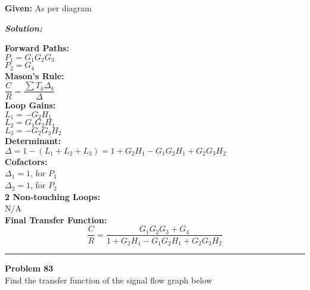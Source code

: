 \documentclass[11pt,letterpaper]{article}
\begin{document}
\noindent\textbf{Given:} As per diagram

\vspace{12pt}
\noindent\textit{\textbf{Solution:}}
\begin{center}
\vspace{12pt}

\noindent\textbf{Forward Paths:} \\
\hspace*{1em} \( P_1 = G_1G_2G_3 \) \\
\hspace*{1em} \( P_2 = G_4 \) \\[6pt]

\noindent\textbf{Mason's Rule:} \\
\hspace*{1em} \( \dfrac{C}{R} = \dfrac{\sum T_k\Delta_k}{\Delta} \) \\[6pt]

\noindent\textbf{Loop Gains:} \\
\hspace*{1em} \( L_1 = -G_2H_1 \) \\
\hspace*{1em} \( L_2 = G_1G_2H_1 \) \\
\hspace*{1em} \( L_3 = -G_2G_3H_2 \) \\[6pt]

\noindent\textbf{Determinant:} \\
\hspace*{1em} \( \Delta = 1 - (L_1 + L_2 + L_3) = 1 + G_2H_1 - G_1G_2H_1 + G_2G_3H_2 \) \\[6pt]

\noindent\textbf{Cofactors:} \\
\hspace*{1em} \( \Delta_1 = 1 \), for \( P_1 \) \\
\hspace*{1em} \( \Delta_2 = 1 \), for \( P_2 \) \\[6pt]

\noindent\textbf{2 Non-touching Loops:} \\
\hspace*{1em} N/A \\[6pt]

\noindent\textbf{Final Transfer Function:}
\[
\boxed{
\dfrac{C}{R} = \dfrac{G_1G_2G_3 + G_4}{1 + G_2H_1 - G_1G_2H_1 + G_2G_3H_2}
}
\]
\end{center}

\clearpage
\rule{\textwidth}{1pt}
\textbf{Problem 83}\\
Find the transfer function of the signal flow graph below \\
\end{document}
